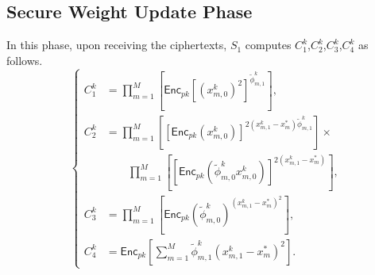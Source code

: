 \documentclass[conference]{IEEEtran}
\begin{document}
\subsection{Secure Weight Update Phase}
In this phase, upon receiving the ciphertexts, $S_1$ computes $C_1^k$,$C_2^k$,$C_3^k$,$C_4^k$ as follows.
\begin{equation*}
  \left\{\begin{aligned}
    C_1^k & = \prod_{m=1}^M\left[ \mathsf{Enc}_{pk}{\left[\left(x_{m,0}^k\right)^2\right]}^{\tilde{\phi}_{m,1}^k} \right] , \\
    C_2^k & =  \prod_{m=1}^M\left[ \left[\mathsf{Enc}_{pk}\left(x_{m,0}^k\right)\right]^{2\left(x_{m,1}^k - x_m^*\right)\tilde{\phi}_{m,1}^k}\right] \times \\
          & \qquad \prod_{m=1}^M\left[ \left[\mathsf{Enc}_{pk}\left(\tilde{\phi}_{m,0}^k x_{m,0}^k\right)\right]^{2\left(x_{m,1}^k - x_m^*\right)} \right] , \\
     C_3^k & = \prod_{m=1}^M\left[ \mathsf{Enc}_{pk}\left(\tilde{\phi}_{m,0}^k\right)^{\left(x_{m,1}^k - x_m^*\right)^2} \right] , \\
     C_4^k & = \mathsf{Enc}_{pk}\left[\sum_{m=1}^M \tilde{\phi}_{m,1}^k \left(x_{m,1}^k - x_m^*\right)^2\right] .
    \end{aligned}
    \right.
\end{equation*}
\end{document}
